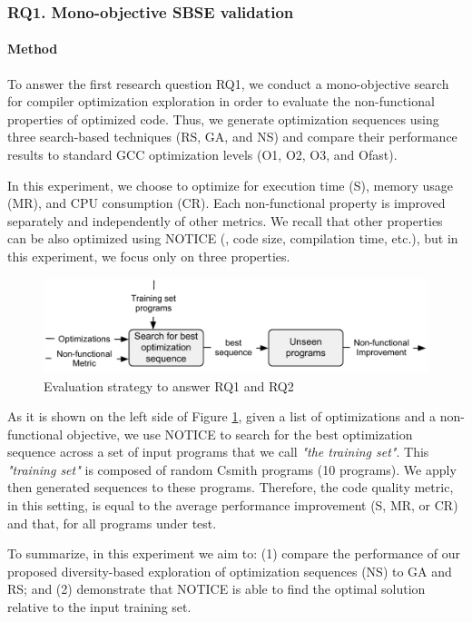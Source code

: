 \subsubsection{RQ1. Mono-objective SBSE validation}
\paragraph{Method}

To answer the first research question RQ1, we conduct a mono-objective search for compiler optimization exploration in order to evaluate the non-functional properties of optimized code. Thus, we generate optimization sequences using three search-based techniques (RS, GA, and NS) and compare their performance results to standard GCC optimization levels (O1, O2, O3, and Ofast). 

In this experiment, we choose to optimize for execution time (S), memory usage (MR), and CPU consumption (CR). Each non-functional property is improved separately and independently of other metrics. We recall that other properties can be also optimized using NOTICE (\eg, code size, compilation time, etc.), but in this experiment, we focus only on three properties.


\begin{figure}[h]
	\centering
	\includegraphics[width=1.\linewidth]{chapitre3/fig/sensitivity.pdf}
	\caption{Evaluation strategy to answer RQ1 and RQ2}
	\label{fig:sensitivity.pdf}
\end{figure}


As it is shown on the left side of Figure \ref{fig:sensitivity.pdf}, given a list of optimizations and a non-functional objective, we use NOTICE to search for the best optimization sequence across a set of input programs that we call \textit{"the training set"}. This \textit{"training set"} is composed of random Csmith programs (10 programs). We apply then generated sequences to these programs. Therefore, the code quality metric, in this setting, is equal to the average performance improvement (S, MR, or CR) and that, for all programs under test. 


To summarize, in this experiment we aim to: (1) compare the performance of our proposed diversity-based exploration of optimization sequences (NS) to GA and RS; and (2) demonstrate that NOTICE is able to find the optimal solution relative to the input training set.

